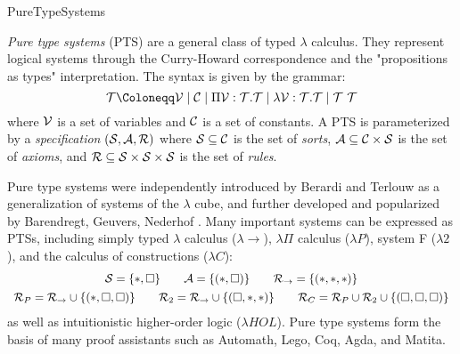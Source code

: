 \begin{entry}{PureTypeSystems}
\begin{clarifications}
\emph{Pure type systems} (PTS) are a general class of typed $\lambda$ calculus. They represent logical systems through the Curry-Howard correspondence and the "propositions as types" interpretation. The syntax is given by the grammar:
\negvspace\[
  \terms \Coloneqq \variables \mid \constants \mid \Pi \variables : \terms. \terms \mid \lambda \variables : \terms. \terms \mid \terms~\terms
\negvspace\]
where $\mathcal{V}$ is a set of variables and $\mathcal{C}$ is a set of constants.
A PTS is parameterized by a \emph{specification} $(\mathcal{S}, \mathcal{A}, \mathcal{R})$ where
$\mathcal{S} \subseteq \mathcal{C}$ is the set of \emph{sorts},
$\mathcal{A} \subseteq \mathcal{C} \times \mathcal{S}$ is the set of \emph{axioms}, and
$\mathcal{R} \subseteq \mathcal{S} \times \mathcal{S} \times \mathcal{S}$ is the set of \emph{rules}.
\end{clarifications}

\begin{history}
Pure type systems were independently introduced by Berardi and Terlouw as a generalization of systems of the $\lambda$ cube, and further developed and popularized by Barendregt, Geuvers, Nederhof \cite{geuvers_modular_1991,barendregt_introduction_1991,barendregt_lambda_1992,geuvers_logics_1993}. Many important systems can be expressed as PTSs, including simply typed $\lambda$ calculus ($\lambda{\rightarrow}$), $\lambda\Pi$ calculus  ($\lambda{P}$), system F  ($\lambda{2}$), and the calculus of constructions ($\lambda{C}$):
\negvspace\[
  \begin{array}{cc}
    \sorts = \{\Prop, \Type\} \qquad \axioms = \{(\Prop, \Type)\} \qquad \rules_{\rightarrow} = \{(\Prop, \Prop, \Prop)\} \\[1ex]
    \rules_{P} = \rules_{\rightarrow} \union \{(\Prop,\Type,\Type)\} \qquad
    \rules_{2} = \rules_{\rightarrow} \union \{(\Type,\Prop,\Prop)\} \qquad
    \rules_{C} = \rules_{P} \union \rules_{2} \union \{(\Type,\Type,\Type)\}
  \end{array}
\negvspace\]
as well as intuitionistic higher-order logic ($\lambda{HOL}$). Pure type systems form the basis of many proof assistants such as Automath, Lego, Coq, Agda, and Matita.
\end{history}


\end{entry}
